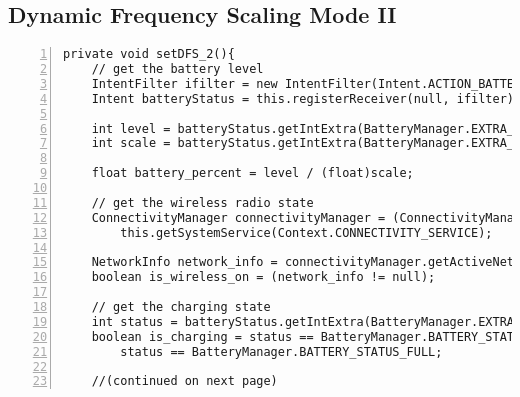 \documentclass{article} %
\begin{document}
\subsection{Dynamic Frequency Scaling Mode II}
\begin{lstlisting}[float=*,caption={Dynamic Frequency Scaling Mode II},label={lst:DFS_2},numbers=left]
private void setDFS_2(){
    // get the battery level
    IntentFilter ifilter = new IntentFilter(Intent.ACTION_BATTERY_CHANGED);
    Intent batteryStatus = this.registerReceiver(null, ifilter);

    int level = batteryStatus.getIntExtra(BatteryManager.EXTRA_LEVEL, -1);
    int scale = batteryStatus.getIntExtra(BatteryManager.EXTRA_SCALE, -1);

    float battery_percent = level / (float)scale;

    // get the wireless radio state
    ConnectivityManager connectivityManager = (ConnectivityManager)
        this.getSystemService(Context.CONNECTIVITY_SERVICE);

    NetworkInfo network_info = connectivityManager.getActiveNetworkInfo();
    boolean is_wireless_on = (network_info != null);

    // get the charging state
    int status = batteryStatus.getIntExtra(BatteryManager.EXTRA_STATUS, -1);
    boolean is_charging = status == BatteryManager.BATTERY_STATUS_CHARGING ||
        status == BatteryManager.BATTERY_STATUS_FULL;

    //(continued on next page)    
\end{lstlisting}
\end{document}
